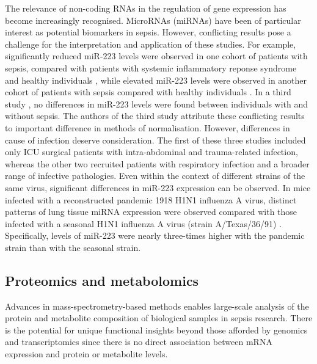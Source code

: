 The relevance of non-coding RNAs in the regulation of gene expression has become increasingly recognised. MicroRNAs (miRNAs) have been of particular interest as potential biomarkers in sepsis. However, conflicting results pose a challenge for the interpretation and application of these studies. For example, significantly reduced miR-223 levels were observed in one cohort of patients with sepsis, compared with patients with systemic inflammatory reponse syndrome and healthy individuals \parencite{Wang2010}, while elevated miR-223 levels were observed in another cohort of patients with sepsis compared with healthy individuals \parencite{Wang2012}. In a third study \parencite{Benz2015}, no differences in miR-223 levels were found between individuals with and without sepsis. The authors of the third study attribute these conflicting results to important difference in methods of normalisation. However, differences in cause of infection deserve consideration. The first of these three studies included only ICU surgical patients with intra-abdominal and trauma-related infection, whereas the other two recruited patients with respiratory infection and a broader range of infective pathologies. Even within the context of different strains of the same virus, significant differences in miR-223 expression can be observed. In mice infected with a reconstructed pandemic 1918 H1N1 influenza A virus, distinct patterns of lung tissue miRNA expression were observed compared with those infected with a seasonal H1N1 influenza A virus (strain A/Texas/36/91) \parencite{Li2010}. Specifically, levels of miR-223 were nearly three-times higher with the pandemic strain than with the seasonal strain.

\subsection{Proteomics and metabolomics}
Advances in mass-spectrometry-based methods enables large-scale analysis of the protein and metabolite composition of biological samples in sepsis research. There is the potential for unique functional insights beyond those afforded by genomics and transcriptomics since there is no direct association between mRNA expression and protein or metabolite levels.

